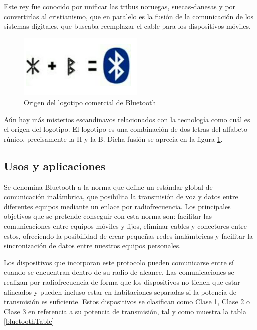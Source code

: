 	Este rey fue conocido por unificar las tribus noruegas, suecas-danesas y por convertirlas al cristianismo, que en paralelo es la fusión de la comunicación de los sistemas digitales, que buscaba reemplazar el cable para los dispositivos móviles.
	

\begin{figure}[h] \centering
\includegraphics[width=6cm]{graphs/bluetooth_logo.png} 
\caption{Origen del logotipo comercial de Bluetooth \cite{bluetoothoficial}}
\label{bluetoothOrigin}
\end{figure}

	Aún hay más misterios escandinavos relacionados con la tecnología como cuál es el origen del logotipo. El logotipo es una combinación de dos letras del alfabeto rúnico, precisamente la H y la B. Dicha fusión se aprecia en la figura \ref{bluetoothOrigin}.

\subsection{Usos y aplicaciones }\label{cap:usosAplicaciones}
	Se denomina Bluetooth a la norma que define un estándar global de comunicación inalámbrica, que posibilita la transmisión de voz y datos entre diferentes equipos mediante un enlace por radiofrecuencia. Los principales objetivos que se pretende conseguir con esta norma son: facilitar las comunicaciones entre equipos móviles y fijos, eliminar cables y conectores entre estos, ofreciendo la posibilidad de crear pequeñas redes inalámbricas y facilitar la sincronización de datos entre nuestros equipos personales.
	
	Los dispositivos que incorporan este protocolo pueden comunicarse entre sí cuando se encuentran dentro de su radio de alcance. Las comunicaciones se realizan por radiofrecuencia de forma que los dispositivos no tienen que estar alineados y pueden incluso estar en habitaciones separadas si la potencia de transmisión es suficiente. Estos dispositivos se clasifican como Clase 1, Clase 2 o Clase 3 en referencia a su potencia de transmisión, tal y como muestra la tabla \ref{bluetoothTable}

